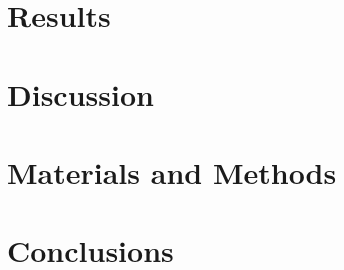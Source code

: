 \documentclass[journal,article,submit,moreauthors,pdftex]{Definitions/mdpi}
\begin{document}
\begin{table}[H]
\begin{tabular}{lllll}
\bottomrule
\end{tabular}
\end{table}

 
\section{Results}


\section{Discussion}


\section{Materials and Methods}


\section{Conclusions}



\vspace{6pt} 
\end{document}
